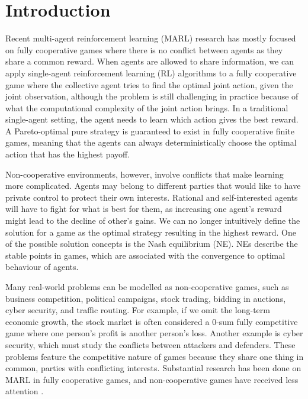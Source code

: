 \documentclass[]{interact}
\theoremstyle{plain}%
\theoremstyle{definition}
\theoremstyle{remark}
\begin{document}
\section{Introduction}
Recent multi-agent reinforcement learning (MARL) research has mostly focused on fully cooperative games \cite{yu2020benchmarking, papoudakis2020benchmarking, zhu2024survey} where there is no conflict between agents as they share a common reward. When agents are allowed to share information, we can apply single-agent reinforcement learning (RL) algorithms to a fully cooperative game where the collective agent tries to find the optimal joint action, given the joint observation, although the problem is still challenging in practice because of what the computational complexity of the joint action brings. In a traditional single-agent setting, the agent needs to learn which action gives the best reward. A Pareto-optimal pure strategy is guaranteed to exist in fully cooperative finite games, meaning that the agents can always deterministically choose the optimal action that has the highest payoff.

Non-cooperative environments, however, involve conflicts that make learning more complicated. Agents may belong to different parties that would like to have private control to protect their own interests. Rational and self-interested agents will have to fight for what is best for them, as increasing one agent's reward might lead to the decline of other's gains. We can no longer intuitively define the solution for a game as the optimal strategy resulting in the highest reward. One of the possible solution concepts is the Nash equilibrium (NE). NEs describe the stable points in games, which are associated with the convergence to optimal behaviour of agents.

Many real-world problems can be modelled as non-cooperative games, such as business competition, political campaigns, stock trading, bidding in auctions, cyber security, and traffic routing. For example, if we omit the long-term economic growth, the stock market is often considered a 0-sum fully competitive game where one person's profit is another person's loss. Another example is cyber security, which must study the conflicts between attackers and defenders. These problems feature the competitive nature of games because they share one thing in common, parties with conflicting interests. Substantial research has been done on MARL in fully cooperative games, and non-cooperative games have received less attention \cite{zhu2024survey, li2024fightladder}.
\end{document}
